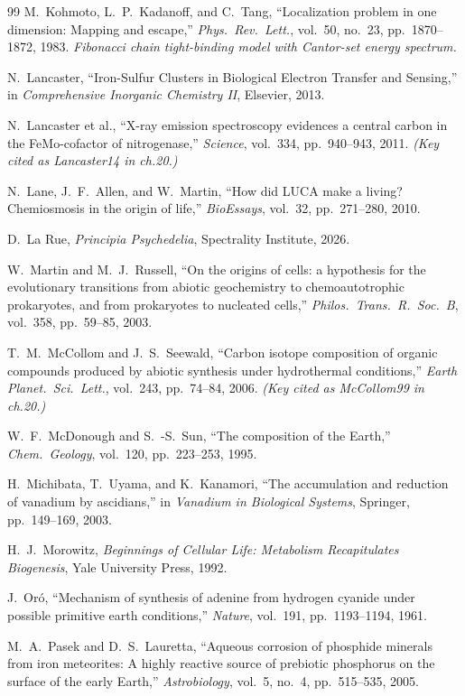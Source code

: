 \begin{thebibliography}{99}
M.~Kohmoto, L.~P.~Kadanoff, and C.~Tang,
``Localization problem in one dimension: Mapping and escape,''
\emph{Phys.\ Rev.\ Lett.}, vol.~50, no.~23, pp.~1870--1872, 1983.
\textit{Fibonacci chain tight-binding model with Cantor-set energy spectrum.}

N.~Lancaster,
``Iron-Sulfur Clusters in Biological Electron Transfer and Sensing,''
in \emph{Comprehensive Inorganic Chemistry II}, Elsevier, 2013.

N.~Lancaster et al.,
``X-ray emission spectroscopy evidences a central carbon in the FeMo-cofactor of nitrogenase,''
\emph{Science}, vol.~334, pp.~940--943, 2011.
\textit{(Key cited as Lancaster14 in ch.20.)}

N.~Lane, J.~F.~Allen, and W.~Martin,
``How did LUCA make a living? Chemiosmosis in the origin of life,''
\emph{BioEssays}, vol.~32, pp.~271--280, 2010.

D.~La Rue,
\emph{Principia Psychedelia},
Spectrality Institute, 2026.

W.~Martin and M.~J.~Russell,
``On the origins of cells: a hypothesis for the evolutionary transitions from
abiotic geochemistry to chemoautotrophic prokaryotes, and from prokaryotes to
nucleated cells,''
\emph{Philos.\ Trans.\ R.\ Soc.\ B}, vol.~358, pp.~59--85, 2003.

T.~M.~McCollom and J.~S.~Seewald,
``Carbon isotope composition of organic compounds produced by abiotic synthesis under hydrothermal conditions,''
\emph{Earth Planet.\ Sci.\ Lett.}, vol.~243, pp.~74--84, 2006.
\textit{(Key cited as McCollom99 in ch.20.)}

W.~F.~McDonough and S.~-S.~Sun,
``The composition of the Earth,''
\emph{Chem.\ Geology}, vol.~120, pp.~223--253, 1995.

H.~Michibata, T.~Uyama, and K.~Kanamori,
``The accumulation and reduction of vanadium by ascidians,''
in \emph{Vanadium in Biological Systems}, Springer, pp.~149--169, 2003.

H.~J.~Morowitz,
\emph{Beginnings of Cellular Life: Metabolism Recapitulates Biogenesis},
Yale University Press, 1992.

J.~Or\'o,
``Mechanism of synthesis of adenine from hydrogen cyanide under possible primitive earth conditions,''
\emph{Nature}, vol.~191, pp.~1193--1194, 1961.

M.~A.~Pasek and D.~S.~Lauretta,
``Aqueous corrosion of phosphide minerals from iron meteorites: A highly reactive source of prebiotic phosphorus on the surface of the early Earth,''
\emph{Astrobiology}, vol.~5, no.~4, pp.~515--535, 2005.


\end{thebibliography}
